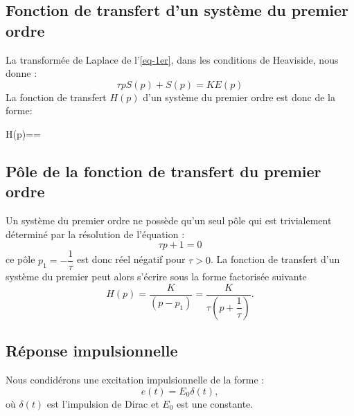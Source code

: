 \subsection*{Fonction de transfert d'un système du premier ordre}
La transformée de Laplace de l'\cref{eq-1er}, dans les conditions de 
Heaviside, nous donne :
\[
\tau pS(p)+S(p)=KE(p)
\]
La fonction de transfert $H(p)$ d'un système du premier ordre est 
donc de la forme:
\begin{bequation}
    H(p)==\label{eq-ft1er}
\end{bequation}
\subsection*{Pôle de la fonction de transfert du premier ordre}
Un système du premier ordre ne possède qu'un seul pôle qui est trivialement 
déterminé par la résolution de l'équation :
\[
\tau p + 1 =0
\]
ce pôle $p_1=-\dfrac{1}{\tau}$ est donc réel négatif pour $\tau>0$.
La fonction de transfert d'un système du premier peut alors s'écrire 
sous la forme factorisée suivante
\[
H(p)=\dfrac{K}{(p-p_1)}=\dfrac{K}{\tau\left(p+\dfrac{1}{\tau}\right)}.
\]
\begin{figure}[b]
    \centering
    
\end{figure}

\clearpage
\thispagestyle{empty}
\captionsetup{width=\linewidth}
\subsection*{Réponse impulsionnelle}
Nous condidérons une excitation impulsionnelle de la forme :
\[
e(t)=E_0\delta(t),
\]
où $\delta(t)$ est l'impulsion de Dirac et $E_0$ est une constante.

